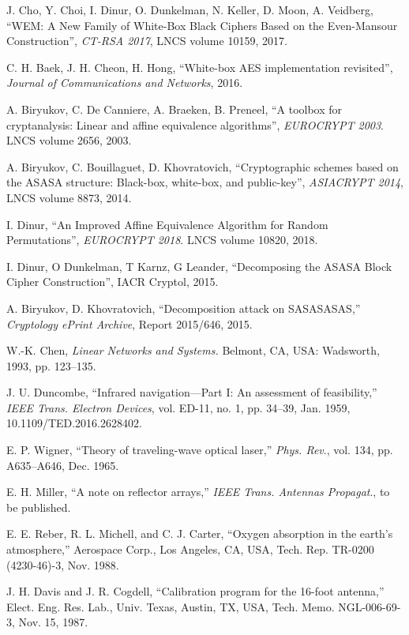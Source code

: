 \documentclass{ieeeaccess}
\begin{document}
\begin{thebibliography}{00}
J. Cho, Y. Choi, I. Dinur, O. Dunkelman, N. Keller, D. Moon, A. Veidberg, 
``WEM: A New Family of White-Box Black Ciphers Based on the Even-Mansour Construction'', 
\emph{CT-RSA 2017}, LNCS volume 10159, 2017.

 C. H. Baek, J. H. Cheon, H. Hong, 
 ``White-box AES implementation revisited'', 
 \emph{Journal of Communications and Networks}, 2016.
 
A. Biryukov, C. De Canniere, A. Braeken, B. Preneel, 
``A toolbox for cryptanalysis: Linear and affine equivalence algorithms'', 
\emph{EUROCRYPT 2003}. LNCS volume 2656, 2003.

A. Biryukov, C. Bouillaguet, D. Khovratovich, 
``Cryptographic schemes based on the ASASA structure: Black-box, white-box, and public-key'', 
\emph{ASIACRYPT 2014}, LNCS volume 8873, 2014.

I. Dinur, 
``An Improved Affine Equivalence Algorithm for Random Permutations'', 
\emph{EUROCRYPT 2018}. LNCS volume 10820, 2018.

I. Dinur, O Dunkelman, T Karnz, G Leander, 
``Decomposing the ASASA Block Cipher Construction'', IACR Cryptol, 2015.

A. Biryukov, D. Khovratovich, 
``Decomposition attack on SASASASAS,'' 
\emph{Cryptology ePrint Archive}, Report 2015/646, 2015.



 W.-K. Chen, \emph{Linear Networks and Systems.} Belmont, CA, USA: Wadsworth, 1993, pp. 123--135.

 J. U. Duncombe, ``Infrared navigation---Part I: An assessment of feasibility,'' \emph{IEEE Trans. Electron Devices}, vol. ED-11, no. 1, pp. 34--39, Jan. 1959, 10.1109/TED.2016.2628402.

 E. P. Wigner, ``Theory of traveling-wave optical laser,'' \emph{Phys. Rev}., vol. 134, pp. A635--A646, Dec. 1965.

 E. H. Miller, ``A note on reflector arrays,'' \emph{IEEE Trans. Antennas Propagat}., to be published.

 E. E. Reber, R. L. Michell, and C. J. Carter, ``Oxygen absorption in the earth's atmosphere,'' Aerospace Corp., Los Angeles, CA, USA, Tech. Rep. TR-0200 (4230-46)-3, Nov. 1988.

 J. H. Davis and J. R. Cogdell, ``Calibration program for the 16-foot antenna,'' Elect. Eng. Res. Lab., Univ. Texas, Austin, TX, USA, Tech. Memo. NGL-006-69-3, Nov. 15, 1987.


\end{thebibliography}
\end{document}
